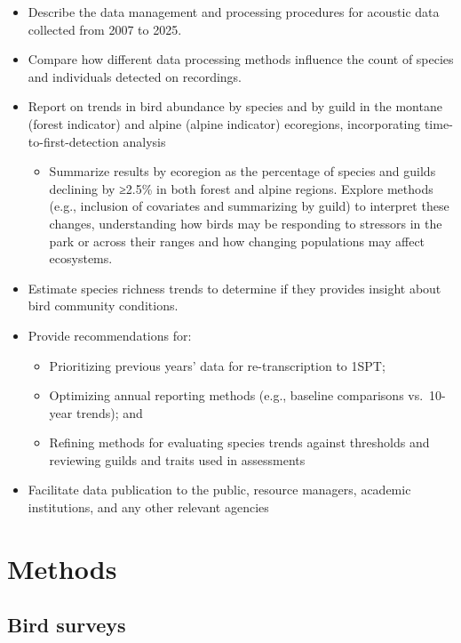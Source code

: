 \documentclass[
  letterpaper,
  DIV=11,
  numbers=noendperiod]{scrartcl}
\providecommand{\tightlist}{%
  \setlength{\itemsep}{0pt}\setlength{\parskip}{0pt}}
\begin{document}
\begin{itemize}
\tightlist
\item
  Describe the data management and processing procedures for acoustic
  data collected from 2007 to 2025.
\item
  Compare how different data processing methods influence the count of
  species and individuals detected on recordings.
\item
  Report on trends in bird abundance by species and by guild in the
  montane (forest indicator) and alpine (alpine indicator) ecoregions,
  incorporating time-to-first-detection analysis

  \begin{itemize}
  \tightlist
  \item
    Summarize results by ecoregion as the percentage of species and
    guilds declining by ≥2.5\% in both forest and alpine regions.
    Explore methods (e.g., inclusion of covariates and summarizing by
    guild) to interpret these changes, understanding how birds may be
    responding to stressors in the park or across their ranges and how
    changing populations may affect ecosystems.
  \end{itemize}
\item
  Estimate species richness trends to determine if they provides insight
  about bird community conditions.
\item
  Provide recommendations for:

  \begin{itemize}
  \tightlist
  \item
    Prioritizing previous years' data for re-transcription to 1SPT;
  \item
    Optimizing annual reporting methods (e.g., baseline comparisons
    vs.~10-year trends); and
  \item
    Refining methods for evaluating species trends against thresholds
    and reviewing guilds and traits used in assessments
  \end{itemize}
\item
  Facilitate data publication to the public, resource managers, academic
  institutions, and any other relevant agencies
\end{itemize}

\section{Methods}\label{methods}

\subsection{Bird surveys}\label{bird-surveys}
\end{document}
